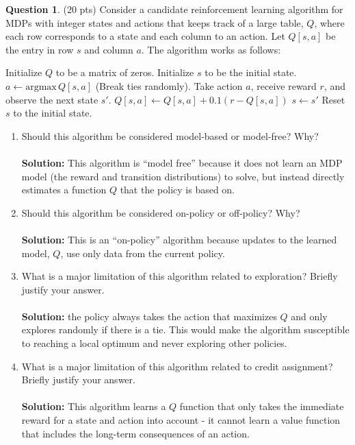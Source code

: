 \documentclass{article}
\theoremstyle{definition}
\newtheorem{question}[thm]{Question}
\begin{document}
\begin{question} (20 pts)
    Consider a candidate reinforcement learning algorithm for MDPs with integer states and actions that keeps track of a large table, $Q$, where each row corresponds to a state and each column to an action. Let $Q[s, a]$ be the entry in row $s$ and column $a$.
    The algorithm works as follows: 
    \\
    \begin{algorithmic}[1]
        \State Initialize $Q$ to be a matrix of zeros.
        \State Initialize $s$ to be the initial state.
        \Loop
            \State $a \gets \text{argmax}\, Q[s, a]$ (Break ties randomly).
            \State Take action $a$, receive reward $r$, and observe the next state $s'$.
            \State $Q[s, a] \gets Q[s, a] + 0.1 (r - Q[s, a])$
            \State $s \gets s'$
                \State Reset $s$ to the initial state.
            \EndIf
        \EndLoop
    \end{algorithmic}

    \begin{enumerate}[label=(\alph*)]
        \item Should this algorithm be considered model-based or model-free? Why?
        \\ \\ \noindent \textbf{Solution: } This algorithm is ``model free'' because it does not learn an MDP model (the reward and transition distributions) to solve, but instead directly estimates a function $Q$ that the policy is based on. \\
        \item Should this algorithm be considered on-policy or off-policy? Why?
        \\ \\ \noindent \textbf{Solution:} This is an ``on-policy'' algorithm because updates to the learned model, $Q$, use only data from the current policy.\\
        \item What is a major limitation of this algorithm related to exploration? Briefly justify your answer.
        \\ \\ \noindent \textbf{Solution: } the policy always takes the action that maximizes $Q$ and only explores randomly if there is a tie. This would make the algorithm susceptible to reaching a local optimum and never exploring other policies. \\
        \item What is a major limitation of this algorithm related to credit assignment? Briefly justify your answer.
        \\ \\ \noindent \textbf{Solution: } This algorithm learns a $Q$ function that only takes the immediate reward for a state and action into account - it cannot learn a value function that includes the long-term consequences of an action. \\
    \end{enumerate}
\end{question}
\end{document}
